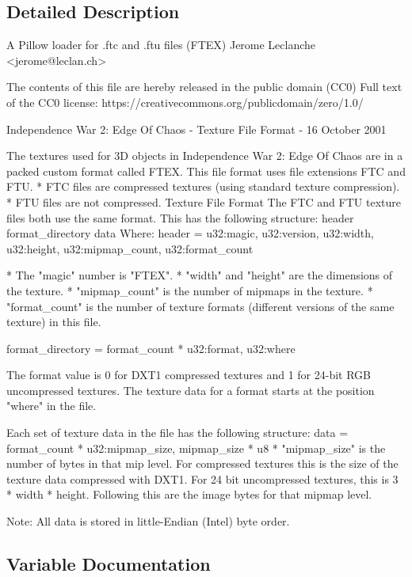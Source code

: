 \subsection{Detailed Description}
\begin{DoxyVerb}A Pillow loader for .ftc and .ftu files (FTEX)
Jerome Leclanche <jerome@leclan.ch>

The contents of this file are hereby released in the public domain (CC0)
Full text of the CC0 license:
  https://creativecommons.org/publicdomain/zero/1.0/

Independence War 2: Edge Of Chaos - Texture File Format - 16 October 2001

The textures used for 3D objects in Independence War 2: Edge Of Chaos are in a
packed custom format called FTEX. This file format uses file extensions FTC
and FTU.
* FTC files are compressed textures (using standard texture compression).
* FTU files are not compressed.
Texture File Format
The FTC and FTU texture files both use the same format. This
has the following structure:
{header}
{format_directory}
{data}
Where:
{header} = {
    u32:magic,
    u32:version,
    u32:width,
    u32:height,
    u32:mipmap_count,
    u32:format_count
}

* The "magic" number is "FTEX".
* "width" and "height" are the dimensions of the texture.
* "mipmap_count" is the number of mipmaps in the texture.
* "format_count" is the number of texture formats (different versions of the
same texture) in this file.

{format_directory} = format_count * { u32:format, u32:where }

The format value is 0 for DXT1 compressed textures and 1 for 24-bit RGB
uncompressed textures.
The texture data for a format starts at the position "where" in the file.

Each set of texture data in the file has the following structure:
{data} = format_count * { u32:mipmap_size, mipmap_size * { u8 } }
* "mipmap_size" is the number of bytes in that mip level. For compressed
textures this is the size of the texture data compressed with DXT1. For 24 bit
uncompressed textures, this is 3 * width * height. Following this are the image
bytes for that mipmap level.

Note: All data is stored in little-Endian (Intel) byte order.
\end{DoxyVerb}
 

\subsection{Variable Documentation}
\mbox{\label{namespacePIL_1_1FtexImagePlugin_a3423bf78d6db48c6f5876fd46cc0e970}} 
